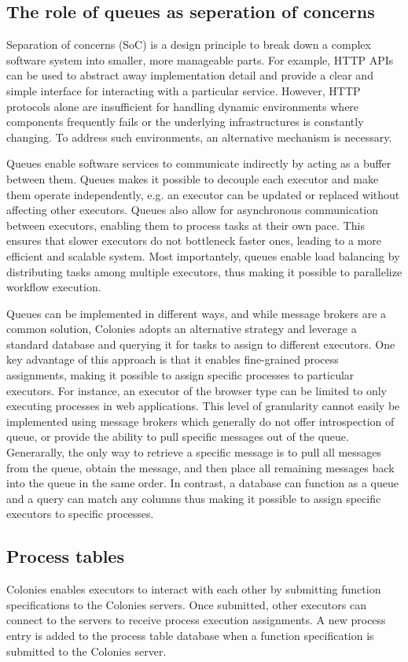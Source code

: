 \documentclass{article}
\begin{document}
\subsection{The role of queues as seperation of concerns}
Separation of concerns (SoC) is a design principle to break down a complex software system into smaller, more manageable parts. For example, HTTP APIs can be used to abstract away implementation detail and provide a clear and simple interface for interacting with a particular service. However, HTTP protocols alone are insufficient for handling dynamic environments where components frequently fails or the underlying infrastructures is constantly changing. To address such environments, an alternative mechanism is necessary. 

Queues enable software services to communicate indirectly by acting as a buffer between them. Queues makes it possible to decouple each executor and make them operate independently, e.g. an executor can be updated or replaced without affecting other executors. Queues also allow for asynchronous communication between executors, enabling them to process tasks at their own pace. This ensures that slower executors do not bottleneck faster ones, leading to a more efficient and scalable system. Most importantely, queues enable load balancing by distributing tasks among multiple executors, thus making it possible to parallelize workflow execution. 

Queues can be implemented in different ways, and while message brokers are a common solution, Colonies adopts an alternative strategy and leverage a standard database and querying it for tasks to assign to different executors. One key advantage of this approach is that it enables fine-grained process assignments, making it possible to assign specific processes to particular executors. For instance, an executor of the browser type can be limited to only executing processes in web applications. This level of granularity cannot easily be implemented using message brokers which generally do not offer introspection of queue, or provide the ability to pull specific messages out of the queue. Generarally, the only way to retrieve a specific message is to pull all messages from the queue, obtain the message, and then place all remaining messages back into the queue in the same order. In contrast, a database can function as a queue and a query can match any columns thus making it possible to assign specific executors to specific processes.

\subsection{Process tables}
Colonies enables executors to interact with each other by submitting function specifications to the Colonies servers. Once submitted, other executors can connect to the servers to receive process execution assignments. A new process entry is added to the process table database when a function specification is submitted to the Colonies server.
\end{document}
